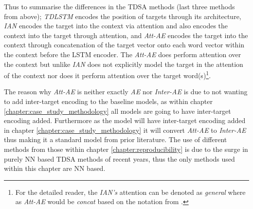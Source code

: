 Thus to summarise the differences in the TDSA methods (last three methods from above); \textit{TDLSTM} encodes the position of targets through its architecture, \textit{IAN} encodes the target into the context via attention and also encodes the context into the target through attention, and \textit{Att-AE} encodes the target into the context through concatenation of the target vector onto each word vector within the context before the LSTM encoder. The \textit{Att-AE} does perform attention over the context but unlike \textit{IAN} does not explicitly model the target in the attention of the context nor does it perform attention over the target word(s)\footnote{For the detailed reader, the \textit{IAN's} attention can be denoted as \textit{general} where as \textit{Att-AE} would be \textit{concat} based on the notation from \citet[\S3.1]{luong-etal-2015-effective}.}.


The reason why \textit{Att-AE} is neither exactly \textit{AE} \citep{wang-etal-2016-attention} nor \textit{Inter-AE} \citep{hazarika-etal-2018-modeling} is due to not wanting to add inter-target encoding to the baseline models, as within chapter \ref{chapter:case_study_methodology} all models are going to have inter-target encoding added. Furthermore as the model will have inter-target encoding added in chapter \ref{chapter:case_study_methodology} it will convert \textit{Att-AE} to \textit{Inter-AE} thus making it a standard model from prior literature. The use of different methods from those within chapter \ref{chapter:reproducibility} is due to the surge in purely NN based TDSA methods of recent years, thus the only methods used within this chapter are NN based.

